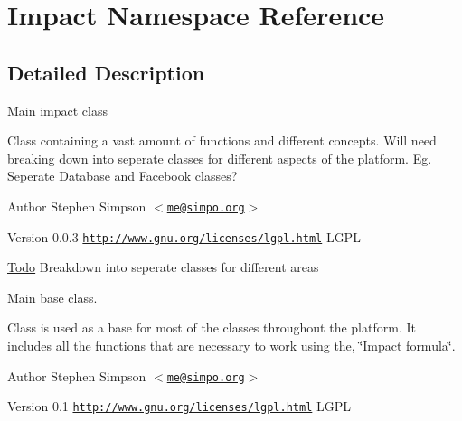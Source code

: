 \hypertarget{namespaceImpact}{
\section{Impact Namespace Reference}
\label{namespaceImpact}
}


\subsection{Detailed Description}
Main impact class

Class containing a vast amount of functions and different concepts. Will need breaking down into seperate classes for different aspects of the platform. Eg. Seperate \hyperlink{namespaceDatabase}{Database} and Facebook classes?

\begin{DoxyAuthor}{Author}
Stephen Simpson $<$\href{mailto:me@simpo.org}{\tt me@simpo.org}$>$ 
\end{DoxyAuthor}
\begin{DoxyVersion}{Version}
0.0.3  \href{http://www.gnu.org/licenses/lgpl.html}{\tt http://www.gnu.org/licenses/lgpl.html} LGPL 
\end{DoxyVersion}
\begin{Desc}
\item[\hyperlink{todo__todo000002}{Todo}]Breakdown into seperate classes for different areas\end{Desc}


Main base class.

Class is used as a base for most of the classes throughout the platform. It includes all the functions that are necessary to work using the, \char`\"{}Impact formula\char`\"{}.

\begin{DoxyAuthor}{Author}
Stephen Simpson $<$\href{mailto:me@simpo.org}{\tt me@simpo.org}$>$ 
\end{DoxyAuthor}
\begin{DoxyVersion}{Version}
0.1  \href{http://www.gnu.org/licenses/lgpl.html}{\tt http://www.gnu.org/licenses/lgpl.html} LGPL 
\end{DoxyVersion}
